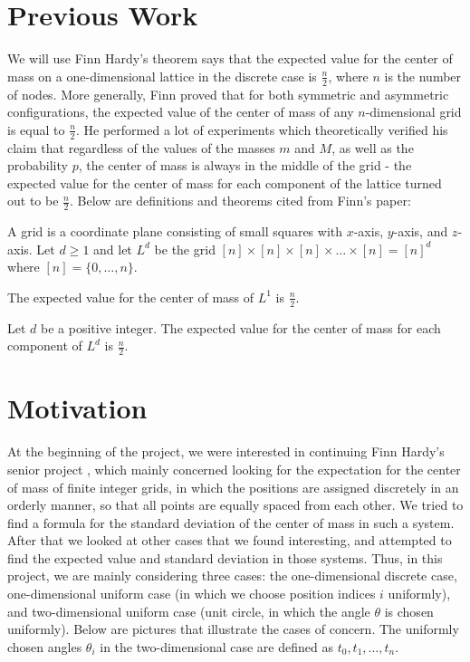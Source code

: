 \documentclass[11pt, twoside, reqno]{book}
\begin{document}
\section{Previous Work}
\label{sec2}

We will use Finn Hardy's theorem says that the expected value for the center of mass on a one-dimensional lattice in the discrete case is $\frac{n}{2}$, where $n$ is the number of nodes. More generally, Finn proved that for both symmetric and asymmetric configurations, the expected value of the center of mass of any $n$-dimensional grid is equal to $\frac{n}{2}$. He performed a lot of experiments which theoretically verified his claim that regardless of the values of the masses $m$ and $M$, as well as the probability $p$, the center of mass is always in the middle of the grid - the expected value for the center of mass for each component of the lattice turned out to be $\frac{n}{2}$. Below are definitions and theorems cited from Finn's paper:

A grid is a coordinate plane consisting of small squares with $x$-axis, $y$-axis, and $z$-axis. Let $d \geq 1$ and let $L^{d}$ be the grid $[n] \times [n] \times [n] \times \dots \times [n] = [n]^{d}$ where $[n]=\{0,\dots,n\}$.
\edefn

\thm
The expected value for the center of mass of $L^{1}$ is $\frac{n}{2}$.
\ethm

\thm
Let $d$ be a positive integer. The expected value for the center of mass for each component of $L^{d}$ is $\frac{n}{2}$.
\ethm

\section{Motivation}
\label{sec3}

At the beginning of the project, we were interested in continuing Finn Hardy's senior project \cite{Bib5}, which mainly concerned looking for the expectation for the center of mass of finite integer grids, in which the positions are assigned discretely in an orderly manner, so that all points are equally spaced from each other. We tried to find a formula for the standard deviation of the center of mass in such a system. After that we looked at other cases that we found interesting, and attempted to find the expected value and standard deviation in those systems. Thus, in this project, we are mainly considering three cases: the one-dimensional discrete case, one-dimensional uniform case (in which we choose position indices $i$ uniformly), and two-dimensional uniform case (unit circle, in which the angle $\theta$ is chosen uniformly). Below are pictures that illustrate the cases of concern. The uniformly chosen angles $\theta_{i}$ in the two-dimensional case are defined as $t_{0},t_{1}, \dots, t_{n}$. \\
\end{document}
